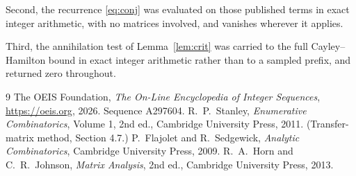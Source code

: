 \documentclass[11pt,a4paper]{article}
\theoremstyle{plain}
\theoremstyle{definition}
\begin{document}
Second, the recurrence \eqref{eq:conj} was evaluated on those published terms in exact
integer arithmetic, with no matrices involved, and vanishes wherever it applies.

Third, the annihilation test of Lemma~\ref{lem:crit} was carried to the full
Cayley--Hamilton bound in exact integer arithmetic rather than to a sampled prefix, and
returned zero throughout.

\begin{thebibliography}{9}
 The OEIS Foundation, \emph{The On-Line Encyclopedia of Integer
Sequences}, \url{https://oeis.org}, 2026. Sequence A297604.
 R.~P.~Stanley, \emph{Enumerative Combinatorics}, Volume 1, 2nd ed.,
Cambridge University Press, 2011. (Transfer-matrix method, Section 4.7.)
 P.~Flajolet and R.~Sedgewick, \emph{Analytic Combinatorics}, Cambridge
University Press, 2009.
 R.~A.~Horn and C.~R.~Johnson, \emph{Matrix Analysis}, 2nd ed., Cambridge
University Press, 2013.
\end{thebibliography}
\end{document}

